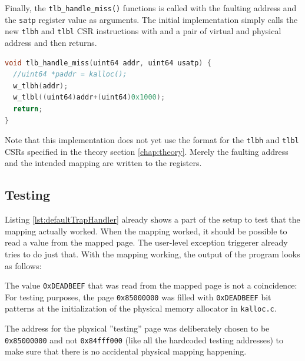 Finally, the \texttt{tlb\_handle\_miss()} functions is called with the faulting address and the \texttt{satp} register
value as arguments.
The initial implementation simply calls the new \texttt{tlbh} and \texttt{tlbl} CSR instructions with and a pair of virtual and physical address and then
returns.
\begin{lstlisting}[language={C},float=h!,
    label={lst:defaultTrapHandler}, caption={Simple TLB miss exception handler for a single fixed address}]
void tlb_handle_miss(uint64 addr, uint64 usatp) {
  //uint64 *paddr = kalloc();
  w_tlbh(addr);
  w_tlbl((uint64)addr+(uint64)0x1000);
  return;
}
\end{lstlisting}

Note that this implementation does not yet use the format for the \texttt{tlbh} and \texttt{tlbl} CSRs specified
in the theory section \ref{chap:theory}.
Merely the faulting address and the intended mapping are written to the registers.

\subsection{Testing}
Listing \ref{lst:defaultTrapHandler} already shows a part of the setup to test that the mapping actually worked.
When the mapping worked, it should be possible to read a value from the mapped page.
The user-level exception triggerer already tries to do just that.
With the mapping working, the output of the program looks as follows:


The value \texttt{0xDEADBEEF} that was read from the mapped page is not a coincidence:
For testing purposes, the page \texttt{0x85000000} was filled with \texttt{0xDEADBEEF} bit patterns at the initialization of the physical memory allocator in \texttt{kalloc.c}.

The address for the physical ''testing'' page was deliberately chosen to be \texttt{0x85000000} and not
\texttt{0x84fff000} (like all the hardcoded testing addresses) to make sure that there is no accidental physical
mapping happening.






